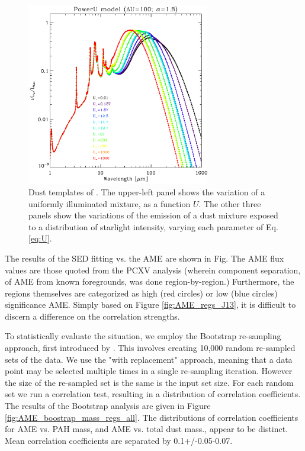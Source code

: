\documentclass[preprint2,longabstract]{aastex}
\begin{document}
\begin{figure}
  \includegraphics[width=80mm]{../Plots/template_powerU_Um_G11_AC.pdf}
  \centering
  \caption{Dust templates of \cite{galliano11}. The upper-left panel shows the variation of a uniformly illuminated mixture, as a function $U$. The other three panels show the variations of the emission of a dust mixture exposed to a distribution of starlight intensity, varying each parameter of Eq. \ref{eq:U}.  }
\end{figure}
    The results of the SED fitting vs. the AME are shown in Fig. The AME flux values are those quoted from the PCXV analysis (wherein component separation, of AME from known foregrounds, was done region-by-region.) Furthermore, the regions themselves are categorized as high (red circles) or low (blue circles) significance AME. Simply based on Figure \ref{fig:AME_regs_J13}, it is difficult to discern a difference on the correlation strengths.

     To statistically evaluate the situation, we employ the Bootstrap re-sampling approach, first introduced by \cite{efron79}. This involves creating 10,000 random re-sampled sets of the data. We use the "with replacement" approach, meaning that a data point may be selected multiple times in a single re-sampling iteration. However the size of the re-sampled set is the same is the input set size. For each random set we run a correlation test, resulting in a distribution of correlation coefficients. The results of the Bootstrap analysis are given in Figure \ref{fig:AME_boostrap_mass_regs_all}. The distributions of correlation coefficients for AME vs. PAH mass, and AME vs. total dust mass., appear to be distinct. Mean correlation coefficients are separated by 0.1+/-0.05-0.07.

\end{document}
